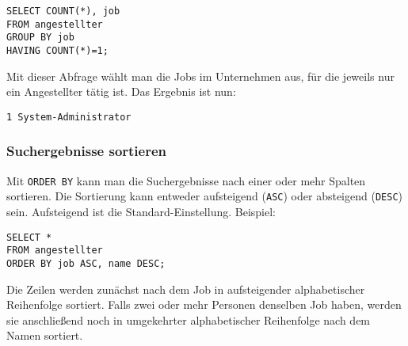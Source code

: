 \begin{lstlisting}
SELECT COUNT(*), job
FROM angestellter
GROUP BY job
HAVING COUNT(*)=1;
\end{lstlisting}

Mit dieser Abfrage wählt man die Jobs im
Unternehmen aus, für die jeweils nur ein
Angestellter tätig ist. Das Ergebnis ist nun:

\texttt{1 System-Administrator}


\subsubsection{Suchergebnisse sortieren}

Mit \lstinline{ORDER BY} kann man die Suchergebnisse nach einer oder mehr
Spalten sortieren. Die Sortierung kann entweder aufsteigend (\lstinline{ASC})
oder absteigend (\lstinline{DESC}) sein. Aufsteigend ist die
Standard-Einstellung. Beispiel:

\begin{lstlisting}
SELECT *
FROM angestellter
ORDER BY job ASC, name DESC;
\end{lstlisting}

Die Zeilen werden zunächst nach dem Job in aufsteigender alphabetischer
Reihenfolge sortiert. Falls zwei oder mehr Personen denselben Job haben, werden
sie anschließend noch in umgekehrter alphabetischer Reihenfolge nach dem Namen
sortiert.
